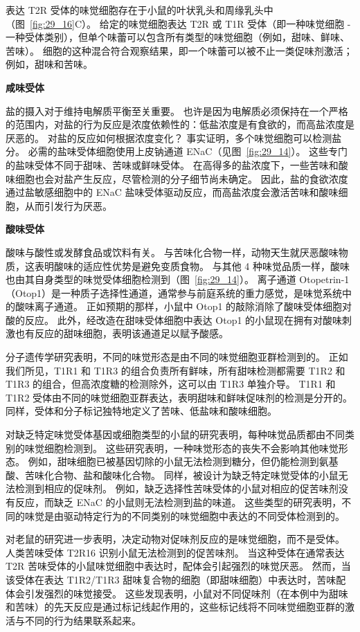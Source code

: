表达 T2R 受体的味觉细胞存在于小鼠的叶状乳头和周缘乳头中（图~\ref{fig:29_16}C）。
给定的味觉细胞表达 T2R 或 T1R 受体（即一种味觉细胞 - 一种受体类别），但单个味蕾可以包含所有类型的味觉细胞（例如，甜味、鲜味、苦味）。
细胞的这种混合符合观察结果，即一个味蕾可以被不止一类促味剂激活； 例如，甜味和苦味。



\textbf{咸味受体}

盐的摄入对于维持电解质平衡至关重要。
也许是因为电解质必须保持在一个严格的范围内，对盐的行为反应是浓度依赖性的：低盐浓度是有食欲的，而高盐浓度是厌恶的。
对盐的反应如何根据浓度变化？
事实证明，多个味觉细胞可以检测盐分。
必需的盐味受体细胞使用上皮钠通道 ENaC（见图~\ref{fig:29_14}）。
这些专门的盐味受体不同于甜味、苦味或鲜味受体。
在高得多的盐浓度下，一些苦味和酸味细胞也会对盐产生反应，尽管检测的分子细节尚未确定。
因此，盐的食欲浓度通过盐敏感细胞中的 ENaC 盐味受体驱动反应，而高盐浓度会激活苦味和酸味细胞，从而引发行为厌恶。



\textbf{酸味受体}

酸味与酸性或发酵食品或饮料有关。
与苦味化合物一样，动物天生就厌恶酸味物质，这表明酸味的适应性优势是避免变质食物。
与其他 4 种味觉品质一样，酸味也由其自身类型的味觉受体细胞检测到（图~\ref{fig:29_14}）。
离子通道 Otopetrin-1（Otop1）是一种质子选择性通道，通常参与前庭系统的重力感觉，是味觉系统中的酸味离子通道。
正如预期的那样，小鼠中 Otop1 的敲除消除了酸味受体细胞对酸的反应。
此外，经改造在甜味受体细胞中表达 Otop1 的小鼠现在拥有对酸味刺激也有反应的甜味细胞，表明该通道足以赋予酸感。


分子遗传学研究表明，不同的味觉形态是由不同的味觉细胞亚群检测到的。
正如我们所见，T1R1 和 T1R3 的组合负责所有鲜味，所有甜味检测都需要 T1R2 和 T1R3 的组合，但高浓度糖的检测除外，这可以由 T1R3 单独介导。
T1R1 和 T1R2 受体由不同的味觉细胞亚群表达，表明甜味和鲜味促味剂的检测是分开的。
同样，受体和分子标记独特地定义了苦味、低盐味和酸味细胞。


对缺乏特定味觉受体基因或细胞类型的小鼠的研究表明，每种味觉品质都由不同类别的味觉细胞检测到。
这些研究表明，一种味觉形态的丧失不会影响其他味觉形态。
例如，甜味细胞已被基因切除的小鼠无法检测到糖分，但仍能检测到氨基酸、苦味化合物、盐和酸味化合物。
同样，被设计为缺乏特定味觉受体的小鼠无法检测到相应的促味剂。
例如，缺乏选择性苦味受体的小鼠对相应的促苦味剂没有反应，而缺乏 ENaC 的小鼠则无法检测到盐的味道。
这些类型的研究表明，不同的味觉是由驱动特定行为的不同类别的味觉细胞中表达的不同受体检测到的。


对老鼠的研究进一步表明，决定动物对促味剂反应的是味觉细胞，而不是受体。
人类苦味受体 T2R16 识别小鼠无法检测到的促苦味剂。
当这种受体在通常表达 T2R 苦味受体的小鼠味觉细胞中表达时，配体会引起强烈的味觉厌恶。
然而，当该受体在表达 T1R2/T1R3 甜味复合物的细胞（即甜味细胞）中表达时，苦味配体会引发强烈的味觉接受。
这些发现表明，小鼠对不同促味剂（在本例中为甜味和苦味）的先天反应是通过标记线起作用的，这些标记线将不同味觉细胞亚群的激活与不同的行为结果联系起来。



